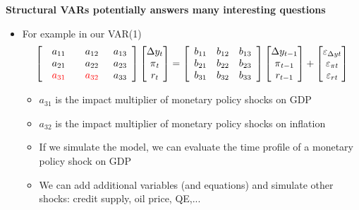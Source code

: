\documentclass[10pt,handout]{beamer}
\begin{document}
\begin{frame}
{\textbf{Structural VARs potentially answers many interesting questions}}

\begin{itemize}
\item For example in our VAR(1)%
\begin{equation*}
\left[ 
\begin{array}{ccc}
a_{11} & a_{12} & a_{13} \\ 
a_{21} & a_{22} & a_{23} \\ 
{%
\begin{array}{c}
\color{red}%
{a}_{{31}}%
\end{array}%
} & {%
\begin{array}{c}
\color{red}%
a_{32}%
\end{array}%
} & a_{33}%
\end{array}%
\right] 
\begin{bmatrix}
\Delta y_{t} \\ 
\pi _{t} \\ 
r_{t}%
\end{bmatrix}%
=\left[ 
\begin{array}{ccc}
b_{11} & b_{12} & b_{13} \\ 
b_{21} & b_{22} & b_{23} \\ 
b_{31} & b_{32} & b_{33}%
\end{array}%
\right] 
\begin{bmatrix}
\Delta y_{t-1} \\ 
\pi _{t-1} \\ 
r_{t-1}%
\end{bmatrix}%
+%
\begin{bmatrix}
\varepsilon _{\Delta yt} \\ 
\varepsilon _{\pi t} \\ 
\varepsilon _{rt}%
\end{bmatrix}%
\end{equation*}%
\pause

\begin{itemize}
\item $a_{31}$ is the impact multiplier of monetary policy shocks on
GDP\smallskip 

\item $a_{32}$ is the impact multiplier of monetary policy shocks on
inflation\smallskip 

\item If we simulate the model, we can evaluate the time profile of a
monetary policy shock on GDP\smallskip 

\item We can add additional variables (and equations) and simulate other
shocks: credit supply, oil price, QE,...
\end{itemize}
\end{itemize}
\end{frame}
\end{document}
